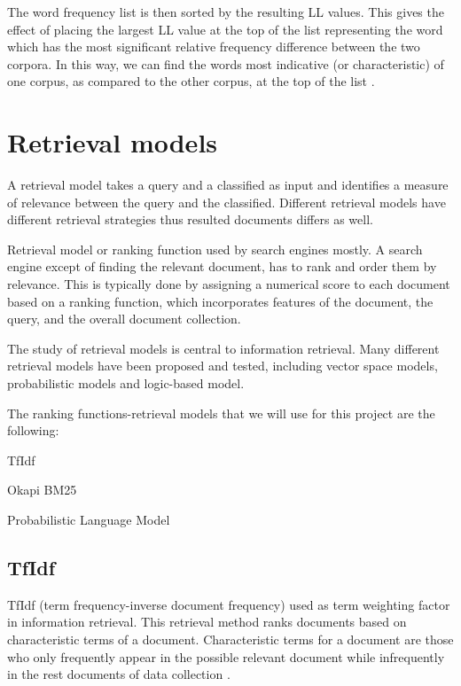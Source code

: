 The word frequency list is then sorted by the resulting LL values. This gives the effect of placing the largest LL value at the top of the list representing the word which has the most significant relative frequency difference between the two corpora. In this way, we can find the words most indicative (or characteristic) of one corpus, as compared to the other corpus, at the top of the list \cite{RaysonGarside}.


\section{Retrieval models}

A retrieval model takes a query and a classified as input and identifies a measure of relevance between the query and the classified. Different retrieval models have different retrieval strategies thus resulted documents differs as well.

Retrieval model or ranking function used by search engines mostly. A search engine except of finding the relevant document, has to rank and order them by relevance. This is typically done by assigning a numerical score to each document based on a ranking function, which incorporates features of the document, the query, and the overall document collection.

The study of retrieval models is central to information retrieval. Many different retrieval models have been proposed and tested, including vector space models, probabilistic models and logic-based model.

The ranking functions-retrieval models that we will use for this project are the following:
\begin{list}{.}{}
\item TfIdf
\item Okapi BM25
\item Probabilistic Language Model
\end{list}

\subsection{TfIdf}

TfIdf (term frequency-inverse document frequency) used as term weighting factor in information retrieval. This retrieval method ranks documents based on characteristic terms of a document. Characteristic terms for a document are those who only frequently appear in the possible relevant document while infrequently in the rest documents of data collection \cite{ShouningSujuanYan}.

